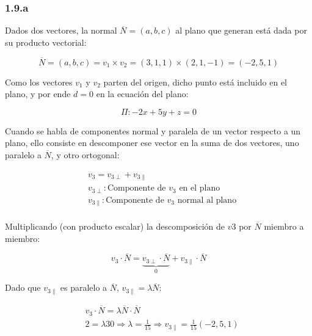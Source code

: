 \documentclass{article}
\begin{document}
\subsubsection*{1.9.a}
\label{subsubsec:1.9.a}

Dados dos vectores, la normal $\overline{N} = (a, b, c)$ al plano que generan está dada por su producto vectorial:

\begin{equation}
\overline{N} = (a, b, c) = v_1 \times v_2 = (3, 1, 1) \times (2, 1, -1) = (-2, 5, 1)
\end{equation}

Como los vectores $v_1$ y $v_2$ parten del origen, dicho punto está incluido en el plano, y por ende $d = 0$ en la ecuación del plano:

\begin{equation}
\Pi: -2x + 5y + z = 0
\end{equation}

Cuando se habla de componentes normal y paralela de un vector respecto a un plano, ello consiste en descomponer ese vector en la suma de dos vectores, uno paralelo a $\overline{N}$, y otro ortogonal:

\begin{subequations}
\begin{align}
& v_3 = v_{3\perp} + v_{3\parallel} \\
& v_{3\perp}: \text{Componente de } v_3 \text{ en el plano} \\
& v_{3\parallel}: \text{Componente de } v_3 \text{ normal al plano} \\
\end{align}
\end{subequations}

Multiplicando (con producto escalar) la descomposición de $v3$ por $\overline{N}$ miembro a miembro:

\begin{equation}
v_3 \cdot \overline{N} = \underbrace{ v_{3\perp} \cdot \overline{N} }_{0} + v_{3\parallel} \cdot \overline{N}
\end{equation}

Dado que $v_{3\parallel}$ es paralelo a $\overline{N}$, $v_{3\parallel} = \lambda \overline{N}$:

\begin{subequations}
\begin{align}
& v_3 \cdot \overline{N} = \lambda \overline{N} \cdot \overline{N} \\
& 2 = \lambda 30 \Rightarrow \lambda = \frac{1}{15} \Rightarrow v_{3\parallel} = \frac{1}{15} (-2, 5, 1)
\end{align}
\end{subequations}
\end{document}
